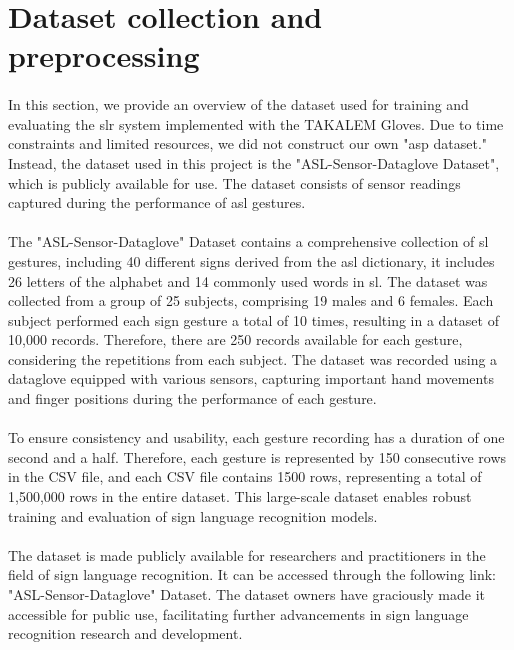\section{Dataset collection and preprocessing}
\paragraph{}
In this section, we provide an overview of the dataset used for training and evaluating the \ac{slr} system implemented with the TAKALEM Gloves. Due to time constraints and limited resources, we did not construct our own "\ac{asp} dataset." Instead, the dataset used in this project is the "ASL-Sensor-Dataglove Dataset", which is publicly available for use. The dataset consists of sensor readings captured during the performance of \ac{asl} gestures.
\paragraph{}
The "ASL-Sensor-Dataglove" Dataset contains a comprehensive collection of \ac{sl} gestures, including 40 different signs derived from the \ac{asl} dictionary, it includes 26 letters of the alphabet and 14 commonly used words in \ac{sl}. The dataset was collected from a group of 25 subjects, comprising 19 males and 6 females. Each subject performed each sign gesture a total of 10 times, resulting in a dataset of 10,000 records. Therefore, there are 250 records available for each gesture, considering the repetitions from each subject. The dataset was recorded using a dataglove equipped with various sensors, capturing important hand movements and finger positions during the performance of each gesture.
\paragraph{}
To ensure consistency and usability, each gesture recording has a duration of one second and a half. Therefore, each gesture is represented by 150 consecutive rows in the CSV file, and each CSV file contains 1500 rows, representing a total of 1,500,000 rows in the entire dataset. This large-scale dataset enables robust training and evaluation of sign language recognition models.
\paragraph{}
The dataset is made publicly available for researchers and practitioners in the field of sign language recognition. It can be accessed through the following link: "ASL-Sensor-Dataglove" Dataset. The dataset owners have graciously made it accessible for public use, facilitating further advancements in sign language recognition research and development.
